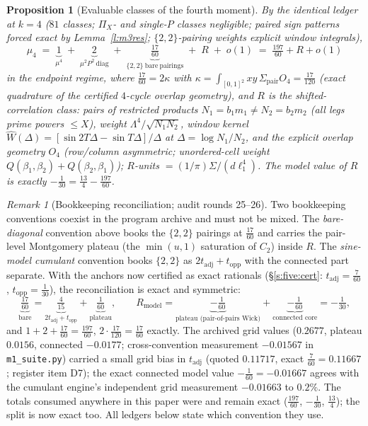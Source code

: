 \documentclass[11pt]{article}
\numberwithin{equation}{section}
\newtheorem{proposition}[theorem]{Proposition}
\theoremstyle{definition}
\theoremstyle{remark}
\newtheorem{remark}[theorem]{Remark}
\newcommand{\LL}{\Lambda}
\begin{document}
\begin{proposition}[Evaluable classes of the fourth
moment]\label{p:m4classical}
By the identical ledger at $k=4$ ($81$ classes; $\Pi_X$- and
single-$P$ classes negligible; paired sign patterns forced exact
by Lemma~\ref{l:m3res}; $\{2,2\}$-pairing weights explicit window
integrals),
\[
\mu_4\;=\;\underbrace{1}_{\mu^4}
\;+\;\underbrace{2}_{\mu^2P^2\ \mathrm{diag}}
\;+\;\underbrace{\tfrac{17}{60}}_{\{2,2\}\ \mathrm{bare\
pairings}}\;+\;R\;+\;o(1)\;=\;\tfrac{197}{60}+R+o(1)
\]
in the endpoint regime, where $\tfrac{17}{60}=2\kappa$ with
$\kappa=\int_{[0,1]^2}xy\,\Sigma_{\mathrm{pair}}O_4
=\tfrac{17}{120}$ (exact quadrature of the certified $4$-cycle
overlap geometry), and $R$ is the shifted-correlation class:
pairs of restricted products $N_1=b_1m_1\ne N_2=b_2m_2$ (all legs
prime powers $\le X$), weight $\LL^4/\sqrt{N_1N_2}$, window
kernel $\widehat W(\Delta)=[\sin2T\Delta-\sin T\Delta]/\Delta$ at
$\Delta=\log N_1/N_2$, and the explicit overlap geometry $O_4$
(row/column asymmetric; unordered-cell weight
$Q(\beta_1,\beta_2)+Q(\beta_2,\beta_1)$); $R$-units
$=(1/\pi)\Sigma/(d\ell_1^4)$. The model value of $R$ is exactly
$-\tfrac1{30}=\tfrac{13}4-\tfrac{197}{60}$.
\end{proposition}

\begin{remark}[Bookkeeping reconciliation; audit
rounds 25--26]\label{r:books}
Two bookkeeping conventions coexist in the program archive and
must not be mixed. The \emph{bare-diagonal} convention above
books the $\{2,2\}$ pairings at $\tfrac{17}{60}$ and carries the
pair-level Montgomery plateau (the $\min(u,1)$ saturation of
$C_2$) inside $R$. The \emph{sine-model cumulant} convention
books $\{2,2\}$ as $2t_{\mathrm{adj}}+t_{\mathrm{opp}}$ with the
connected part separate. With the anchors now certified as exact
rationals (\S\ref{s:five:cert}: $t_{\mathrm{adj}}=\tfrac7{60}$,
$t_{\mathrm{opp}}=\tfrac1{30}$), the reconciliation is exact and
symmetric:
\[
\underbrace{\tfrac{17}{60}}_{\text{bare}}
=\underbrace{\tfrac4{15}}_{2t_{\mathrm{adj}}+t_{\mathrm{opp}}}
+\underbrace{\tfrac1{60}}_{\text{plateau}},
\qquad
R_{\mathrm{model}}
=\underbrace{-\tfrac1{60}}_{\text{plateau (pair-of-pairs Wick)}}
+\underbrace{-\tfrac1{60}}_{\text{connected core}}
=-\tfrac1{30},
\]
and $1+2+\tfrac{17}{60}=\tfrac{197}{60}$,
$2\cdot\tfrac{17}{120}=\tfrac{17}{60}$ exactly. The archived
grid values ($0.2677$, plateau $0.0156$, connected $-0.0177$;
cross-convention measurement $-0.01567$ in
\texttt{m1\_suite.py}) carried a small grid bias in
$t_{\mathrm{adj}}$ (quoted $0.11717$, exact $\tfrac7{60}
=0.11667$; register item D7); the exact connected model value
$-\tfrac1{60}=-0.01667$ agrees with the cumulant engine's
independent grid measurement $-0.01663$ to $0.2\%$. The totals
consumed anywhere in this paper were and remain exact
($\tfrac{197}{60}$, $-\tfrac1{30}$, $\tfrac{13}4$); the split is
now exact too. All ledgers below state which convention they use.
\end{remark}
\end{document}
